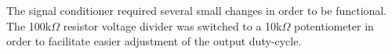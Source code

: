 
The signal conditioner required several small changes in order to be functional. The 100k$\Omega$ resistor voltage divider was switched to a 10k$\Omega$ potentiometer in order to facilitate easier adjustment of the output duty-cycle.

